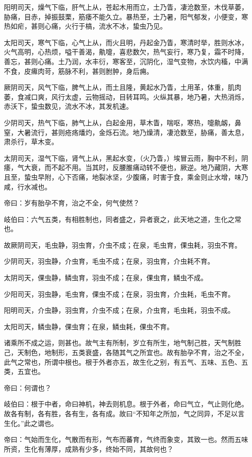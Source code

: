 \documentclass{article}%
\begin{document}
阳明司天，燥气下临，肝气上从，苍起木用而立，土乃眚，凄沧数至，木伐草萎，胁痛，目赤，掉振鼓栗，筋痿不能久立。暴热至，土乃暑，阳气郁发，小便变，寒热如疟，甚则心痛，火行于槁，流水不冰，蛰虫乃见。

太阳司天，寒气下临，心气上从，而火且明，丹起金乃眚，寒清时举，胜则水冰，火气高明，心热烦，嗌干善渴，鼽嚏，喜悲数欠，热气妄行，寒乃复，霜不时降，善忘，甚则心痛。土乃润，水丰衍，寒客至，沉阴化，湿气变物，水饮内稸，中满不食，皮𤸷肉苛，筋脉不利，甚则胕肿，身后痈。

厥阴司天，风气下临，脾气上从，而土且隆，黄起水乃眚，土用革，体重，肌肉萎，食减口爽，风行太虚，云物摇动，目转耳鸣。火纵其暴，地乃暑，大热消烁，赤沃下，蛰虫数见，流水不冰，其发机速。

少阴司天，热气下临，肺气上从，白起金用，草木眚，喘呕，寒热，嚏鼽衂，鼻窒，大暑流行，甚则疮疡燔灼，金烁石流。地乃燥清，凄沧数至，胁痛，善太息，肃杀行，草木变。

太阴司天，湿气下临，肾气上从，黑起水变，（火乃眚，）埃冒云雨，胸中不利，阴痿，气大衰，而不起不用。当其时，反腰脽痛动转不便也，厥逆。地乃藏阴，大寒且至，蛰虫早附，心下否痛，地裂冰坚，少腹痛，时害于食，乘金则止水增，味乃咸，行水减也。

帝曰：岁有胎孕不育，治之不全，何气使然？

岐伯曰：六气五类，有相胜制也，同者盛之，异者衰之，此天地之道，生化之常也。

故厥阴司天，毛虫静，羽虫育，介虫不成；在泉，毛虫育，倮虫耗，羽虫不育。

少阴司天，羽虫静，介虫育，毛虫不成；在泉，羽虫育，介虫耗不育。

太阴司天，倮虫静，鳞虫育，羽虫不成；在泉，倮虫育，鳞虫不成。

少阳司天，羽虫静，毛虫育，倮虫不成；在泉，羽虫育，介虫耗，毛虫不育。

阳明司天，介虫静，羽虫育，介虫不成；在泉，介虫育，毛虫耗，羽虫不成。

太阳司天，鳞虫静，倮虫育；在泉，鳞虫耗，倮虫不育。

诸乘所不成之运，则甚也。故气主有所制，岁立有所生，地气制己胜，天气制胜己，天制色，地制形，五类衰盛，各随其气之所宜也。故有胎孕不育，治之不全，此气之常也，所谓中根也。根于外者亦五，故生化之别，有五气、五味、五色、五类，五宜也。

帝曰：何谓也？

岐伯曰：根于中者，命曰神机，神去则机息。根于外者，命曰气立，气止则化绝。故各有制，各有胜，各有生，各有成。故曰“不知年之所加，气之同异，不足以言生化。”此之谓也。

帝曰：气始而生化，气散而有形，气布而蕃育，气终而象变，其致一也。然而五味所资，生化有薄厚，成熟有少多，终始不同，其故何也？
\end{document}
